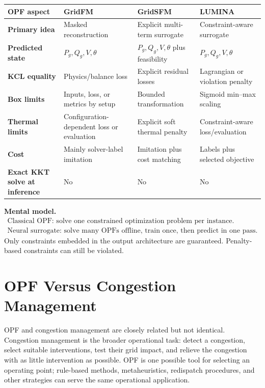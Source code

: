 \documentclass[11pt,a4paper]{article}
\begin{document}
\small
\begin{tabularx}{\textwidth}{>{\bfseries}p{}XXX}
\toprule
OPF aspect & GridFM & GridSFM & LUMINA\\
\midrule
Primary idea & Masked reconstruction & Explicit multi-term surrogate & Constraint-aware surrogate\\
Predicted state & $P_g,Q_g,V,\theta$ & $P_g,Q_g,V,\theta$ plus feasibility & $P_g,Q_g,V,\theta$\\
KCL equality & Physics/balance loss & Explicit residual losses & Lagrangian or violation penalty\\
Box limits & Inputs, loss, or metrics by setup & Bounded transformation & Sigmoid min--max scaling\\
Thermal limits & Configuration-dependent loss or evaluation & Explicit soft thermal penalty & Constraint-aware loss/evaluation\\
Cost & Mainly solver-label imitation & Imitation plus cost matching & Labels plus selected objective\\
Exact KKT solve at inference & No & No & No\\
\bottomrule
\end{tabularx}
\normalsize

\begin{summarybox}
\textbf{Mental model.}
\[
\begin{array}{c}
\text{Classical OPF: solve one constrained optimization problem per instance.}\\[5pt]
\text{Neural surrogate: solve many OPFs offline, train once, then predict in one pass.}
\end{array}
\]
Only constraints embedded in the output architecture are guaranteed. Penalty-based constraints can still be violated.
\end{summarybox}

\section{OPF Versus Congestion Management}

OPF and congestion management are closely related but not identical. Congestion management is the broader operational task: detect a congestion, select suitable interventions, test their grid impact, and relieve the congestion with as little intervention as possible. OPF is one possible tool for selecting an operating point; rule-based methods, metaheuristics, redispatch procedures, and other strategies can serve the same operational application.
\end{document}

